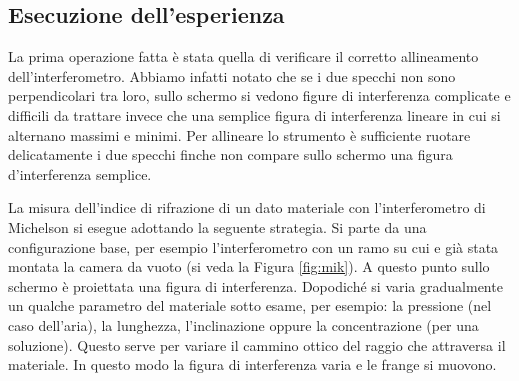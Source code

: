 \subsection{Esecuzione dell'esperienza}

La prima operazione fatta è stata quella di verificare il corretto allineamento dell'interferometro. Abbiamo infatti notato che se i due specchi non sono perpendicolari tra loro, sullo schermo si vedono figure di interferenza complicate e difficili da trattare invece che una semplice figura di interferenza lineare in cui si alternano massimi e minimi. Per allineare lo strumento è sufficiente ruotare delicatamente i due specchi finche non compare sullo schermo una figura d'interferenza semplice.


La misura dell'indice di rifrazione di un dato materiale con l'interferometro di Michelson si esegue adottando la seguente strategia.
Si parte da una configurazione base, per esempio l'interferometro con un ramo su cui e già stata montata la camera da vuoto
(si veda la Figura \ref{fig:mik}). A questo punto sullo schermo è proiettata una figura di interferenza. Dopodiché si
varia gradualmente un qualche parametro del materiale sotto esame, per esempio: la pressione (nel caso dell'aria), la lunghezza,
l'inclinazione oppure la concentrazione (per una soluzione). Questo serve per variare il cammino ottico del raggio che attraversa il materiale.
In questo modo la figura di interferenza varia e le frange si muovono.


%

